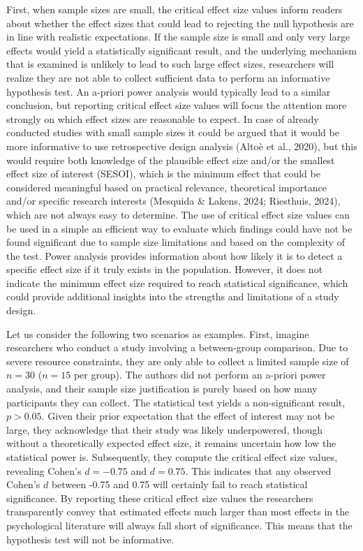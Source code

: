 \documentclass[
  man,floatsintext]{apa7}
\begin{document}
First, when sample sizes are small, the critical effect size values inform readers about whether the effect sizes that could lead to rejecting the null hypothesis are in line with realistic expectations. If the sample size is small and only very large effects would yield a statistically significant result, and the underlying mechanism that is examined is unlikely to lead to such large effect sizes, researchers will realize they are not able to collect sufficient data to perform an informative hypothesis test. An a-priori power analysis would typically lead to a similar conclusion, but reporting critical effect size values will focus the attention more strongly on which effect sizes are reasonable to expect. In case of already conducted studies with small sample sizes it could be argued that it would be more informative to use retrospective design analysis (Altoè et al., 2020), but this would require both knowledge of the plausible effect size and/or the smallest effect size of interest (SESOI), which is the minimum effect that could be considered meaningful based on practical relevance, theoretical importance and/or specific research interests (Mesquida \& Lakens, 2024; Riesthuis, 2024), which are not always easy to determine. The use of critical effect size values can be used in a simple an efficient way to evaluate which findings could have not be found significant due to sample size limitations and based on the complexity of the test. Power analysis provides information about how likely it is to detect a specific effect size if it truly exists in the population. However, it does not indicate the minimum effect size required to reach statistical significance, which could provide additional insights into the strengths and limitations of a study design.

Let us consider the following two scenarios as examples. First, imagine researchers who conduct a study involving a between-group comparison. Due to severe resource constraints, they are only able to collect a limited sample size of \(n = 30\) (\(n = 15\) per group). The authors did not perform an a-priori power analysis, and their sample size justification is purely based on how many participants they can collect. The statistical test yields a non-significant result, \(p > 0.05\). Given their prior expectation that the effect of interest may not be large, they acknowledge that their study was likely underpowered, though without a theoretically expected effect size, it remains uncertain how low the statistical power is. Subsequently, they compute the critical effect size values, revealing Cohen's \(d = -0.75\) and \(d = 0.75\). This indicates that any observed Cohen's \(d\) between -0.75 and 0.75 will certainly fail to reach statistical significance. By reporting these critical effect size values the researchers transparently convey that estimated effects much larger than most effects in the psychological literature will always fall short of significance. This means that the hypothesis test will not be informative.
\end{document}
